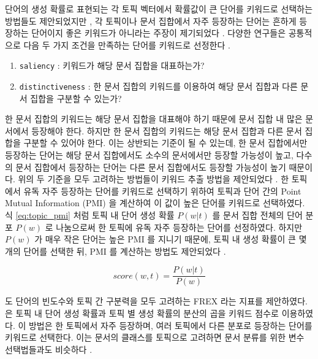 \documentclass[11pt]{article}
\begin{document}
단어의 생성 확률로 표현되는 각 토픽 벡터에서 확률값이 큰 단어를 키워드로 선택하는 방법들도 제안되었지만 \citep{snyder2013topic, chuang2013topic, wallach2009evaluation}, 각 토픽이나 문서 집합에서 자주 등장하는 단어는 흔하게 등장하는 단어이지 좋은 키워드가 아니라는 주장이 제기되었다 \citep{ramage09tmsocial, newman2010evaluating, chuang2012interpretation}.
다양한 연구들은 공통적으로 다음 두 가지 조건을 만족하는 단어를 키워드로 선정한다 \citep{chuang2012termite}.

\begin{enumerate}
  \item \texttt{saliency} : 키워드가 해당 문서 집합을 대표하는가?
  \item \texttt{distinctiveness} : 한 문서 집합의 키워드를 이용하여 해당 문서 집합과 다른 문서 집합을 구분할 수 있는가?
\end{enumerate}

한 문서 집합의 키워드는 해당 문서 집합을 대표해야 하기 때문에 문서 집합 내 많은 문서에서 등장해야 한다.
하지만 한 문서 집합의 키워드는 해당 문서 집합과 다른 문서 집합을 구분할 수 있어야 한다.
이는 상반되는 기준이 될 수 있는데, 한 문서 집합에서만 등장하는 단어는 해당 문서 집합에서도 소수의 문서에서만 등장할 가능성이 높고, 다수의 문서 집합에서 등장하는 단어는 다른 문서 집합에서도 등장할 가능성이 높기 때문이다.
위의 두 기준을 모두 고려하는 방법들이 키워드 추출 방법을 제안되었다 \citep{bischof2012summarizing, newman2010evaluating, taddy2012estimation}.
한 토픽에서 유독 자주 등장하는 단어를 키워드로 선택하기 위하여 \citep{newman2010evaluating, taddy2012estimation, mimno2011optimizing} 토픽과 단어 간의 Point Mutual Information (PMI) 을 계산하여 이 값이 높은 단어를 키워드로 선택하였다.
식 \ref{eq:topic_pmi} 처럼 토픽 내 단어 생성 확률 $P(w \vert t)$ 를 문서 집합 전체의 단어 분포 $P(w)$ 로 나눔으로써 한 토픽에 유독 자주 등장하는 단어를 선정하였다.
하지만 $P(w)$ 가 매우 작은 단어는 높은 PMI 를 지니기 때문에, 토픽 내 생성 확률이 큰 몇 개의 단어를 선택한 뒤, PMI 를 계산하는 방법도 제안되었다 \citep{newman2010evaluating, alsumait2009topic}.

\begin{equation}
  \label{eq:topic_pmi}
  score(w,t) = \frac{P(w \vert t)}{P(w)}
\end{equation}

\citep{bischof2012summarizing} 도 단어의 빈도수와 토픽 간 구분력을 모두 고려하는 FREX 라는 지표를 제안하였다.
\citep{song2009topic} 은 토픽 내 단어 생성 확률과 토픽 별 생성 확률의 분산의 곱을 키워드 점수로 이용하였다.
이 방법은 한 토픽에서 자주 등장하며, 여러 토픽에서 다른 분포로 등장하는 단어를 키워드로 선택한다.
이는 문서의 클래스를 토픽으로 고려하면 문서 분류를 위한 변수 선택법들과도 비슷하다 \citep{largeron2011entropy, popescul2000automatic}.
\end{document}
